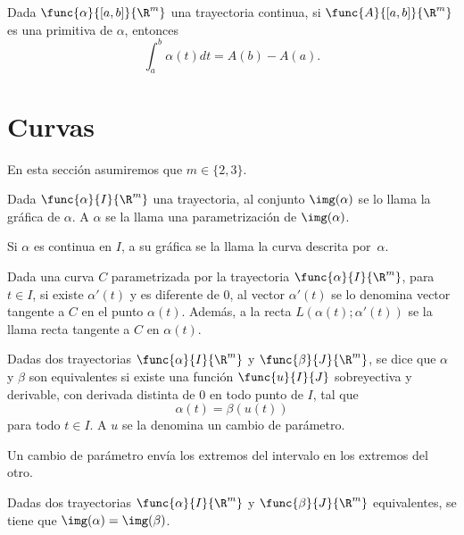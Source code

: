 \documentclass[a4,11pt]{aleph-notas}
\begin{document}
\begin{teo}
    Dada $\func{\alpha}{[a,b]}{\R^m}$ una trayectoria continua, si $\func{A}{[a,b]}{\R^m}$ es una primitiva de $\alpha$, entonces
    \[
        \int_a^b \alpha(t) dt = A(b)-A(a).
    \]
\end{teo}

\section{Curvas}

En esta sección asumiremos que $m\in\{2,3\}$.

\begin{defi}[Curva]
    Dada $\func{\alpha}{I}{\R^m}$ una trayectoria, al conjunto $\img(\alpha)$ se lo llama la gráfica de $\alpha$. A $\alpha$ se la llama una parametrización de $\img(\alpha)$.

    Si $\alpha$ es continua en $I$, a su gráfica se la llama la curva descrita por~$\alpha$.
\end{defi}

\begin{defi}[Tangente]
    Dada una curva $C$ parametrizada por la trayectoria $\func{\alpha}{I}{\R^m}$, para $t\in I$, si existe $\alpha'(t)$ y es diferente de 0, al vector $\alpha'(t)$ se lo denomina vector tangente a $C$ en el punto $\alpha(t)$. Además, a la recta $L(\alpha(t);\alpha'(t))$ se la llama recta tangente a $C$ en $\alpha(t)$.
\end{defi}

\begin{defi}
    Dadas dos trayectorias $\func{\alpha}{I}{\R^m}$ y $\func{\beta}{J}{\R^m}$, se dice que $\alpha$ y $\beta$ son equivalentes si existe una función $\func{u}{I}{J}$ sobreyectiva y derivable, con derivada distinta de 0 en todo punto de $I$, tal que
    \[
        \alpha(t)=\beta(u(t))
    \]
    para todo $t\in I$. A $u$ se la denomina un cambio de parámetro.
\end{defi}

\begin{prop}
    Un cambio de parámetro envía los extremos del intervalo en los extremos del otro.
\end{prop}

\begin{prop}
    Dadas dos trayectorias $\func{\alpha}{I}{\R^m}$ y $\func{\beta}{J}{\R^m}$ equivalentes, se tiene que $\img(\alpha)=\img(\beta)$.
\end{prop}
\end{document}
